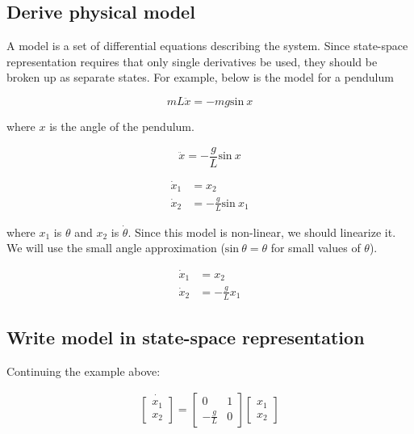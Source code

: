 \documentclass[10pt,conference,compsoc]{IEEEtran}
\begin{document}
\subsection{Derive physical model}

A model is a set of differential equations describing the system. Since
state-space representation requires that only single derivatives be used, they
should be broken up as separate states. For example, below is the model for a
pendulum

\begin{equation}
  mL\ddot{x} = -mg \mathrm{sin}~x
\end{equation}

where $x$ is the angle of the pendulum.

\begin{equation*}
  \ddot{x} = -\frac{g}{L} \mathrm{sin}~x
\end{equation*}

\begin{align*}
  \dot{x}_1 &= x_2 \\
  \dot{x}_2 &= -\frac{g}{L} \mathrm{sin}~x_1
\end{align*}

where $x_1$ is $\theta$ and $x_2$ is $\dot{\theta}$. Since this model is
non-linear, we should linearize it. We will use the small angle approximation
($\mathrm{sin}~\theta = \theta$ for small values of $\theta$).

\begin{align*}
  \dot{x}_1 &= x_2 \\
  \dot{x}_2 &= -\frac{g}{L} x_1
\end{align*}

\subsection{Write model in state-space representation}

Continuing the example above:

\begin{align}
  \dot{\left[
  \begin{array}{c}
    x_1 \\
    x_2
  \end{array} \right]} = \left[
  \begin{array}{cc}
    0 & 1 \\
    -\frac{g}{L} & 0
  \end{array} \right] \left[
  \begin{array}{c}
    x_1 \\
    x_2
  \end{array} \right]
\end{align}
\end{document}
